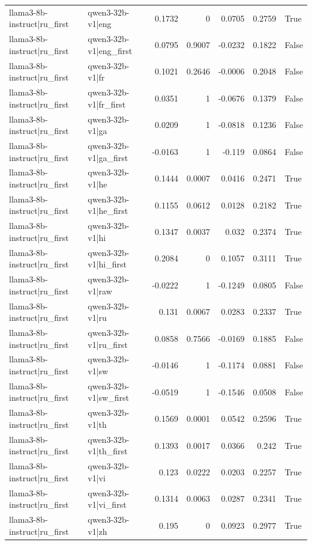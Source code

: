 \begin{table}
\begin{tabular}{l l r r r r l}
llama3-8b-instruct|ru_first & qwen3-32b-v1|eng & 0.1732 & 0 & 0.0705 & 0.2759 & True \\
llama3-8b-instruct|ru_first & qwen3-32b-v1|eng_first & 0.0795 & 0.9007 & -0.0232 & 0.1822 & False \\
llama3-8b-instruct|ru_first & qwen3-32b-v1|fr & 0.1021 & 0.2646 & -0.0006 & 0.2048 & False \\
llama3-8b-instruct|ru_first & qwen3-32b-v1|fr_first & 0.0351 & 1 & -0.0676 & 0.1379 & False \\
llama3-8b-instruct|ru_first & qwen3-32b-v1|ga & 0.0209 & 1 & -0.0818 & 0.1236 & False \\
llama3-8b-instruct|ru_first & qwen3-32b-v1|ga_first & -0.0163 & 1 & -0.119 & 0.0864 & False \\
llama3-8b-instruct|ru_first & qwen3-32b-v1|he & 0.1444 & 0.0007 & 0.0416 & 0.2471 & True \\
llama3-8b-instruct|ru_first & qwen3-32b-v1|he_first & 0.1155 & 0.0612 & 0.0128 & 0.2182 & True \\
llama3-8b-instruct|ru_first & qwen3-32b-v1|hi & 0.1347 & 0.0037 & 0.032 & 0.2374 & True \\
llama3-8b-instruct|ru_first & qwen3-32b-v1|hi_first & 0.2084 & 0 & 0.1057 & 0.3111 & True \\
llama3-8b-instruct|ru_first & qwen3-32b-v1|raw & -0.0222 & 1 & -0.1249 & 0.0805 & False \\
llama3-8b-instruct|ru_first & qwen3-32b-v1|ru & 0.131 & 0.0067 & 0.0283 & 0.2337 & True \\
llama3-8b-instruct|ru_first & qwen3-32b-v1|ru_first & 0.0858 & 0.7566 & -0.0169 & 0.1885 & False \\
llama3-8b-instruct|ru_first & qwen3-32b-v1|sw & -0.0146 & 1 & -0.1174 & 0.0881 & False \\
llama3-8b-instruct|ru_first & qwen3-32b-v1|sw_first & -0.0519 & 1 & -0.1546 & 0.0508 & False \\
llama3-8b-instruct|ru_first & qwen3-32b-v1|th & 0.1569 & 0.0001 & 0.0542 & 0.2596 & True \\
llama3-8b-instruct|ru_first & qwen3-32b-v1|th_first & 0.1393 & 0.0017 & 0.0366 & 0.242 & True \\
llama3-8b-instruct|ru_first & qwen3-32b-v1|vi & 0.123 & 0.0222 & 0.0203 & 0.2257 & True \\
llama3-8b-instruct|ru_first & qwen3-32b-v1|vi_first & 0.1314 & 0.0063 & 0.0287 & 0.2341 & True \\
llama3-8b-instruct|ru_first & qwen3-32b-v1|zh & 0.195 & 0 & 0.0923 & 0.2977 & True \\

\end{tabular}
\end{table}
